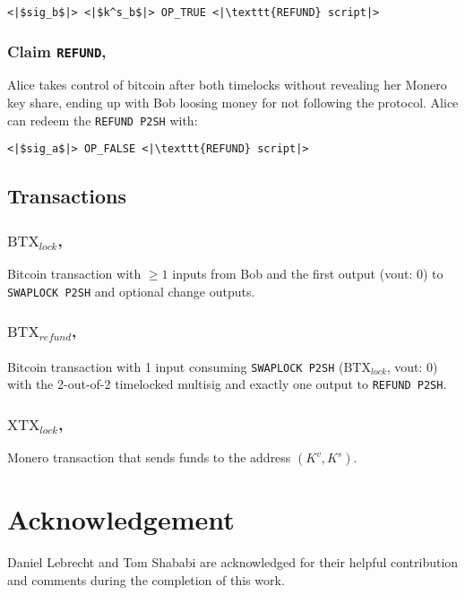 \documentclass{llncs}
\begin{document}
\begin{verbatim}
<|$sig_b$|> <|$k^s_b$|> OP_TRUE <|\texttt{REFUND} script|>
\end{verbatim}

\subsubsection{Claim \texttt{REFUND},}
Alice takes control of bitcoin after both timelocks without revealing her Monero key share, ending up with Bob loosing money for not following the protocol. Alice can redeem the \texttt{REFUND P2SH} with:

\begin{verbatim}
<|$sig_a$|> OP_FALSE <|\texttt{REFUND} script|>
\end{verbatim}

\subsection{Transactions}
\subsubsection{$\text{BTX}_\textit{lock}$,}
Bitcoin transaction with $\geq 1$ inputs from Bob and the first output (vout: 0) to \texttt{SWAPLOCK P2SH} and optional change outputs.

\subsubsection{$\text{BTX}_\textit{refund}$,}
Bitcoin transaction with 1 input consuming \texttt{SWAPLOCK P2SH} ($\text{BTX}_\textit{lock}$, vout: 0) with the 2-out-of-2 timelocked multisig and exactly one output to \texttt{REFUND P2SH}.

\subsubsection{$\text{XTX}_\textit{lock}$,}
Monero transaction that sends funds to the address $(K^v,K^s)$.

\section{Acknowledgement} Daniel Lebrecht and Tom Shababi are acknowledged for their helpful contribution and comments during the completion of this work.

%
%
\printbibliography
\end{document}
